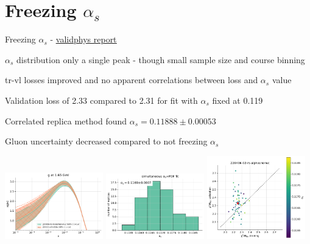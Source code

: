 \documentclass[aspectratio=169,10pt]{beamer}
\begin{document}
\section*{Freezing $\alpha_s$}

\begin{frame}[t]{Freezing $\alpha_s$ - \underline{\href{https://vp.nnpdf.science/J-wRSP3IRxeAMYoImWktBQ==/}{validphys report}}}

  $\alpha_s$ distribution only a single peak - though small sample size and course binning\\\vspace*{0.5em}
  
  tr-vl losses improved and no apparent correlations between loss and $\alpha_s$ value\\\vspace*{0.5em}

  Validation loss of 2.33 compared to 2.31 for fit with $\alpha_s$ fixed at 0.119\\\vspace*{0.5em}

  Correlated replica method found $\alpha_s= 0.11888 \pm 0.00053$\\\vspace*{0.5em}

  Gluon uncertainty decreased compared to not freezing $\alpha_s$

  \vspace*{-8mm}
  \includegraphics[width=0.32\textwidth]{PDFnormalize0_Basespecs0_PDFscalespecs0_plot_pdfs_g_frac75.pdf}  
  \includegraphics[width=0.32\textwidth]{alphas_hist_frac75.pdf}
  \includegraphics[width=0.32\textwidth]{plot_training_validation_frac75.pdf}

\end{frame}
\end{document}
